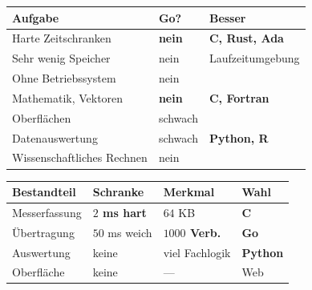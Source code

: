 \begin{merksatz}
\begin{center}
{\small
\renewcommand{\arraystretch}{1.5}
\begin{tabular}{@{}P{3.0cm}P{2.0cm}P{2.8cm}@{}}
\toprule
\textbf{Aufgabe} & \textbf{Go?} & \textbf{Besser}\\
\midrule
Harte Zeitschranken & \textcolor{akzent}{\textbf{nein}} & \textbf{C, Rust, Ada}\\
Sehr wenig Speicher & \textcolor{akzent}{nein} & \textcolor{akzent}{Laufzeit\-umgebung}\\
Ohne Betriebssystem & \textcolor{akzent}{nein} & \\
Mathematik, Vektoren & \textcolor{akzent}{\textbf{nein}} & \textbf{C, Fortran}\\
Oberflächen & \textcolor{akzent}{schwach} & \\
Datenauswertung & \textcolor{akzent}{schwach} & \textbf{Python, R}\\
Wissenschaftliches Rechnen & \textcolor{akzent}{nein} & \\
\bottomrule
\end{tabular}}
\end{center}

\begin{center}
\begin{minipage}{0.88\textwidth}
\end{minipage}
\end{center}

\begin{center}
\end{center}

\begin{technik}
\begin{center}
{\small
\renewcommand{\arraystretch}{1.45}
\begin{tabular}{@{}P{2.6cm}P{2.2cm}P{2.2cm}P{1.8cm}@{}}
\toprule
\textbf{Bestandteil} & \textbf{Schranke} & \textbf{Merkmal} & \textbf{Wahl}\\
\midrule
Messerfassung & \textbf{$2$ ms hart} & $64$ KB & \textcolor{gruen}{\textbf{C}}\\
Übertragung & $50$ ms weich & \textbf{$1000$ Verb.} & \textcolor{gruen}{\textbf{Go}}\\
Auswertung & keine & viel Fachlogik & \textcolor{gruen}{\textbf{Python}}\\
Oberfläche & keine & --- & \textcolor{gruen}{Web}\\
\bottomrule
\end{tabular}}
\end{center}


\end{technik}
\end{merksatz}

